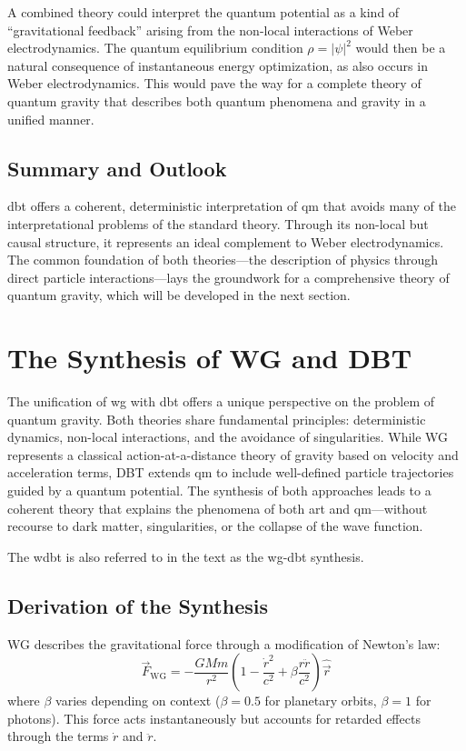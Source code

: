 A combined theory could interpret the quantum potential as a kind of \enquote{gravitational feedback} arising from the non-local interactions of Weber electrodynamics. The quantum equilibrium condition $\rho = \lvert \psi \rvert^{2}$ would then be a natural consequence of instantaneous energy optimization, as also occurs in Weber electrodynamics. This would pave the way for a complete theory of quantum gravity that describes both quantum phenomena and gravity in a unified manner.

\subsection{Summary and Outlook}
\gls{dbt} offers a coherent, deterministic interpretation of \gls{qm} that avoids many of the interpretational problems of the standard theory. Through its non-local but causal structure, it represents an ideal complement to Weber electrodynamics. The common foundation of both theories—the description of physics through direct particle interactions—lays the groundwork for a comprehensive theory of quantum gravity, which will be developed in the next section.

\section{The Synthesis of WG and DBT}
The unification of \gls{wg} with \gls{dbt} offers a unique perspective on the problem of quantum gravity. Both theories share fundamental principles: deterministic dynamics, non-local interactions, and the avoidance of singularities. While WG represents a classical action-at-a-distance theory of gravity based on velocity and acceleration terms, DBT extends \gls{qm} to include well-defined particle trajectories guided by a quantum potential. The synthesis of both approaches leads to a coherent theory that explains the phenomena of both \gls{art} and \gls{qm}—without recourse to dark matter, singularities, or the collapse of the wave function.

The \gls{wdbt} is also referred to in the text as the \gls{wg}-\gls{dbt} synthesis.

\subsection{Derivation of the Synthesis}
WG describes the gravitational force through a modification of Newton's law:
\begin{equation}
    \label{eq:wg-dbt}
    \vec{F}_{\text{WG}} = -\frac{GMm}{r^2}\left(1 - \frac{\dot{r}^2}{c^2} + \beta \frac{r\ddot{r}}{c^2}\right)\hat{\vec{r}}
\end{equation}
where $\beta$ varies depending on context ($\beta=0.5$ for planetary orbits, $\beta=1$ for photons). This force acts instantaneously but accounts for retarded effects through the terms $\dot{r}$ and $\ddot{r}$.

